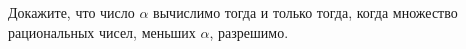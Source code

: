 Докажите, что число $\alpha$ вычислимо тогда и только тогда, когда 
множество рациональных чисел, меньших $\alpha$, разрешимо.